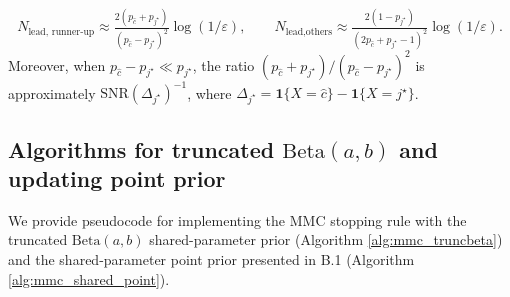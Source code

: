 \small
\begin{equation*}
N_{\text{lead, runner-up}} \approx \tfrac{2\left(p_{\hat{c}} + p_{j^\star}\right)}{\left(p_{\hat{c}} - p_{j^\star}\right)^2}\log(1/\varepsilon), \quad\quad N_{\text{lead,others}} \approx \tfrac{2\left(1- p_{j^\star}\right)}{\left(2p_{\hat{c}} + p_{j^\star}-1\right)^2}\log(1/\varepsilon).
\end{equation*}
\normalsize
Moreover, when $ p_{\hat{c}}-p_{j^\star}\ll p_{j^\star}$, the ratio $\scriptstyle \left(p_{\hat{c}} + p_{j^\star}\right)/{\left(p_{\hat{c}} - p_{j^\star}\right)^2}$ is approximately $\text{SNR}(\Delta_{j^\star})^{-1}$, where $\Delta_{j^\star}=\scriptstyle{ \mathbf 1\{X=\hat c\}-\mathbf 1\{X=j^\star\}}$. 


\subsection{Algorithms for truncated \texorpdfstring{$\mathrm{Beta}(a,b)$}{Beta(a,b)} and updating point prior}
We provide pseudocode for implementing the MMC stopping rule with the truncated $\mathrm{Beta}(a,b)$ shared-parameter prior (Algorithm \ref{alg:mmc_truncbeta}) and the shared-parameter point prior presented in B.1 (Algorithm \ref{alg:mmc_shared_point}).

